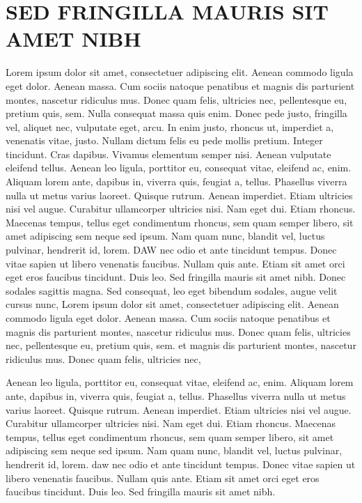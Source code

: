 \setlength{\parindent}{0pt}
\chapter{\bf SED FRINGILLA MAURIS SIT AMET NIBH}

Lorem ipsum dolor sit amet, consectetuer adipiscing elit. Aenean commodo ligula eget dolor. Aenean massa. Cum sociis natoque penatibus et magnis dis parturient montes, nascetur ridiculus mus. Donec quam felis, ultricies nec, pellentesque eu, pretium quis, sem. Nulla consequat massa quis enim. Donec pede justo, fringilla vel, aliquet nec, vulputate eget, arcu. In enim justo, rhoncus ut, imperdiet a, venenatis vitae, justo. Nullam dictum felis eu pede mollis pretium. Integer tincidunt. Cras dapibus. Vivamus elementum semper nisi. Aenean vulputate eleifend tellus. Aenean leo ligula, porttitor eu, consequat vitae, eleifend ac, enim. Aliquam lorem ante, dapibus in, viverra quis, feugiat a, tellus. Phasellus viverra nulla ut metus varius laoreet. Quisque rutrum. Aenean imperdiet. Etiam ultricies nisi vel augue. Curabitur ullamcorper ultricies nisi. Nam eget dui. Etiam rhoncus. Maecenas tempus, tellus eget condimentum rhoncus, sem quam semper libero, sit amet adipiscing sem neque sed ipsum. Nam quam nunc, blandit vel, luctus pulvinar, hendrerit id, lorem. DAW nec odio et ante tincidunt tempus. Donec vitae sapien ut libero venenatis faucibus. Nullam quis ante. Etiam sit amet orci eget eros faucibus tincidunt. Duis leo. Sed fringilla mauris sit amet nibh. Donec sodales sagittis magna. Sed consequat, leo eget bibendum sodales, augue velit cursus nunc, Lorem ipsum dolor sit amet, consectetuer adipiscing elit. Aenean commodo ligula eget dolor. Aenean massa. Cum sociis natoque penatibus et magnis dis parturient montes, nascetur ridiculus mus. Donec quam felis, ultricies nec, pellentesque eu, pretium quis, sem. et magnis dis parturient montes, nascetur ridiculus mus. Donec quam felis, ultricies nec,

Aenean leo ligula, porttitor eu, consequat vitae, eleifend ac, enim. Aliquam lorem ante, dapibus in, viverra quis, feugiat a, tellus. Phasellus viverra nulla ut metus varius laoreet. Quisque rutrum. Aenean imperdiet. Etiam ultricies nisi vel augue. Curabitur ullamcorper ultricies nisi. Nam eget dui. Etiam rhoncus. Maecenas tempus, tellus eget condimentum rhoncus, sem quam semper libero, sit amet adipiscing sem neque sed ipsum. Nam quam nunc, blandit vel, luctus pulvinar, hendrerit id, lorem. \gls{daw} nec odio et ante tincidunt tempus. Donec vitae sapien ut libero venenatis faucibus. Nullam quis ante. Etiam sit amet orci eget eros faucibus tincidunt. Duis leo. Sed fringilla mauris sit amet nibh.

